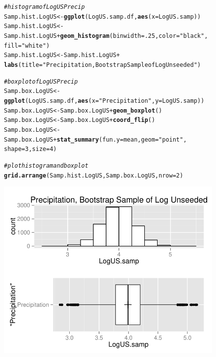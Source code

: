 \documentclass{article}\usepackage[]{graphicx}\usepackage[]{color}
\makeatletter
\def\maxwidth{ %
  \ifdim\Gin@nat@width>\linewidth
    \linewidth
  \else
    \Gin@nat@width
  \fi
}
\newcommand{\hlnum}[1]{\textcolor[rgb]{0.686,0.059,0.569}{#1}}%
\newcommand{\hlstr}[1]{\textcolor[rgb]{0.192,0.494,0.8}{#1}}%
\newcommand{\hlcom}[1]{\textcolor[rgb]{0.678,0.584,0.686}{\textit{#1}}}%
\newcommand{\hlopt}[1]{\textcolor[rgb]{0,0,0}{#1}}%
\newcommand{\hlstd}[1]{\textcolor[rgb]{0.345,0.345,0.345}{#1}}%
\newcommand{\hlkwb}[1]{\textcolor[rgb]{0.69,0.353,0.396}{#1}}%
\newcommand{\hlkwc}[1]{\textcolor[rgb]{0.333,0.667,0.333}{#1}}%
\newcommand{\hlkwd}[1]{\textcolor[rgb]{0.737,0.353,0.396}{\textbf{#1}}}%
\newenvironment{kframe}{%
 \def\at@end@of@kframe{}%
 \ifinner\ifhmode%
  \def\at@end@of@kframe{\end{minipage}}%
  \begin{minipage}{\columnwidth}%
 \fi\fi%
 \def\FrameCommand##1{\hskip\@totalleftmargin \hskip-\fboxsep
 \colorbox{shadecolor}{##1}\hskip-\fboxsep
     \hskip-\linewidth \hskip-\@totalleftmargin \hskip\columnwidth}%
 \MakeFramed {\advance\hsize-\width
   \@totalleftmargin\z@ \linewidth\hsize
   \@setminipage}}%
 {\par\unskip\endMakeFramed%
 \at@end@of@kframe}
\newenvironment{knitrout}{}{} %
\makeatother
\begin{document}
\begin{figure}[H]  \begin{center} \vspace{-0.25in}
\begin{knitrout}
\color{fgcolor}\begin{kframe}
\begin{alltt}
\hlcom{# histogram of LogUS Precip}
\hlstd{Samp.hist.LogUS} \hlkwb{<-} \hlkwd{ggplot}\hlstd{(LogUS.samp.df,} \hlkwd{aes}\hlstd{(}\hlkwc{x} \hlstd{= LogUS.samp))}
\hlstd{Samp.hist.LogUS} \hlkwb{<-} \hlstd{Samp.hist.LogUS} \hlopt{+} \hlkwd{geom_histogram}\hlstd{(}\hlkwc{binwidth} \hlstd{=} \hlnum{.25}\hlstd{,}\hlkwc{color} \hlstd{=} \hlstr{"black"}\hlstd{,}
                                            \hlkwc{fill} \hlstd{=} \hlstr{"white"}\hlstd{)}
\hlstd{Samp.hist.LogUS} \hlkwb{<-} \hlstd{Samp.hist.LogUS} \hlopt{+}
  \hlkwd{labs}\hlstd{(}\hlkwc{title} \hlstd{=} \hlstr{"Precipitation, Bootstrap Sample of Log Unseeded"}\hlstd{)}

\hlcom{# boxplot of LogUS Precip}
\hlstd{Samp.box.LogUS} \hlkwb{<-} \hlkwd{ggplot}\hlstd{(LogUS.samp.df,} \hlkwd{aes}\hlstd{(}\hlkwc{x} \hlstd{=} \hlstr{"Precipitation"}\hlstd{,}\hlkwc{y} \hlstd{= LogUS.samp))}
\hlstd{Samp.box.LogUS} \hlkwb{<-} \hlstd{Samp.box.LogUS} \hlopt{+} \hlkwd{geom_boxplot}\hlstd{()}
\hlstd{Samp.box.LogUS} \hlkwb{<-} \hlstd{Samp.box.LogUS} \hlopt{+} \hlkwd{coord_flip}\hlstd{()}
\hlstd{Samp.box.LogUS} \hlkwb{<-} \hlstd{Samp.box.LogUS} \hlopt{+} \hlkwd{stat_summary}\hlstd{(}\hlkwc{fun.y} \hlstd{= mean,} \hlkwc{geom} \hlstd{=} \hlstr{"point"}\hlstd{,}
                                        \hlkwc{shape} \hlstd{=} \hlnum{3}\hlstd{,} \hlkwc{size} \hlstd{=} \hlnum{4}\hlstd{)}

\hlcom{# plot histogram and boxplot}
\hlkwd{grid.arrange}\hlstd{(Samp.hist.LogUS, Samp.box.LogUS,} \hlkwc{nrow} \hlstd{=} \hlnum{2}\hlstd{)}
\end{alltt}
\end{kframe}
\includegraphics[width=\maxwidth]{figure/1a_box_LogUS} 


\end{knitrout}
\end{center}
\end{figure}
\end{document}
